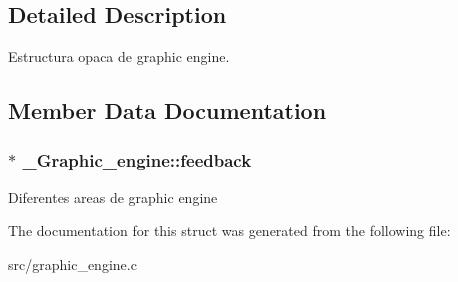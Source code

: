 \subsection{Detailed Description}
Estructura opaca de graphic engine. 

\subsection{Member Data Documentation}
\hypertarget{struct__Graphic__engine_aaae226ce3b87e512ec196f792ed2f552}{
\subsubsection[{feedback}]{ $\ast$ \+\_\+\+Graphic\+\_\+engine\+::feedback}}\label{struct__Graphic__engine_aaae226ce3b87e512ec196f792ed2f552}
Diferentes areas de graphic engine 

The documentation for this struct was generated from the following file\+:\begin{DoxyCompactItemize}
\item 
src/graphic\+\_\+engine.\+c\end{DoxyCompactItemize}
